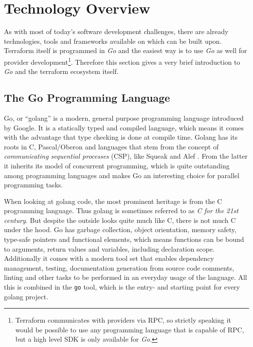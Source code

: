\documentclass[paper=a4,11pt,numbers=noenddot]{article}
\begin{document}
\section{Technology Overview}
\label{sec:technology-overview}

As with most of today's software development challenges, there are already technologies, tools and frameworks available on which can be built upon. Terraform itself is programmed in \emph{Go} and the easiest way is to use \emph{Go} as well for provider development\footnote{Terraform communicates with providers via RPC, so strictly speaking it would be possible to use any programming language that is capable of RPC, but a high level SDK is only available for \emph{Go}.}. Therefore this section gives a very brief introduction to \emph{Go} and the terraform ecosystem itself.

\subsection{The Go Programming Language}
\label{subsec:go-progr-lang}

Go, or ``golang'' is a modern, general purpose programming language introduced by Google. It is a statically typed and compiled language, which means it comes with the advantage that type checking is done at compile time. Golang has its roots in C, Pascal/Oberon and languages that stem from the concept of \emph{communicating sequential processes} (CSP), like Squeak and Alef \autocite{donovan_go_2016}. From the latter it inherits its model of concurrent programming, which is quite outstanding among programming languages and makes Go an interesting choice for parallel programming tasks.

When looking at golang code, the most prominent heritage is from the C programming language. Thus golang is sometimes referred to as \emph{C for the 21st century}. But despite the outside looks quite much like C, there is not much C under the hood. Go has garbage collection, object orientation, memory safety, type-safe pointers and functional elements, which means functions can be bound to arguments, return values and variables, including declaration scope. Additionally it comes with a modern tool set that enables dependency management, testing, documentation generation from source code comments, linting and other tasks to be performed in an everyday usage of the language. All this is combined in the \verb'go' tool, which is the entry- and starting point for every golang project.
\end{document}
